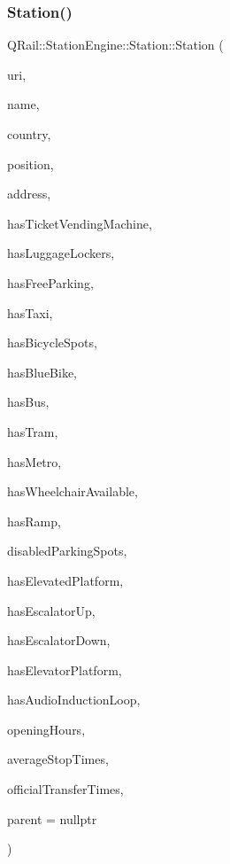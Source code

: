\subsubsection{\texorpdfstring{Station()}{Station()}\hspace{0.1cm}{\footnotesize\ttfamily [3/5]}}
{\footnotesize\ttfamily Q\+Rail\+::\+Station\+Engine\+::\+Station\+::\+Station (\begin{DoxyParamCaption}\item[{const Q\+Url \&}]{uri,  }\item[{const Q\+Map$<$ Q\+Locale\+::\+Language, Q\+String $>$ \&}]{name,  }\item[{const Q\+Locale\+::\+Country \&}]{country,  }\item[{const Q\+Geo\+Coordinate \&}]{position,  }\item[{const Q\+Geo\+Address \&}]{address,  }\item[{const bool \&}]{has\+Ticket\+Vending\+Machine,  }\item[{const bool \&}]{has\+Luggage\+Lockers,  }\item[{const bool \&}]{has\+Free\+Parking,  }\item[{const bool \&}]{has\+Taxi,  }\item[{const bool \&}]{has\+Bicycle\+Spots,  }\item[{const bool \&}]{has\+Blue\+Bike,  }\item[{const bool \&}]{has\+Bus,  }\item[{const bool \&}]{has\+Tram,  }\item[{const bool \&}]{has\+Metro,  }\item[{const bool \&}]{has\+Wheelchair\+Available,  }\item[{const bool \&}]{has\+Ramp,  }\item[{const qint16 \&}]{disabled\+Parking\+Spots,  }\item[{const bool \&}]{has\+Elevated\+Platform,  }\item[{const bool \&}]{has\+Escalator\+Up,  }\item[{const bool \&}]{has\+Escalator\+Down,  }\item[{const bool \&}]{has\+Elevator\+Platform,  }\item[{const bool \&}]{has\+Audio\+Induction\+Loop,  }\item[{const Q\+Map$<$ \mbox{\hyperlink{classQRail_1_1StationEngine_1_1Station_ae8c109a1d5ce2bb41959e62e32392631}{Station\+Engine\+::\+Station\+::\+Day}}, Q\+Pair$<$ Q\+Time, Q\+Time $>$$>$ \&}]{opening\+Hours,  }\item[{const qreal \&}]{average\+Stop\+Times,  }\item[{const quint32 \&}]{official\+Transfer\+Times,  }\item[{Q\+Object $\ast$}]{parent = {\ttfamily nullptr} }\end{DoxyParamCaption})\hspace{0.3cm}{\ttfamily [explicit]}}

